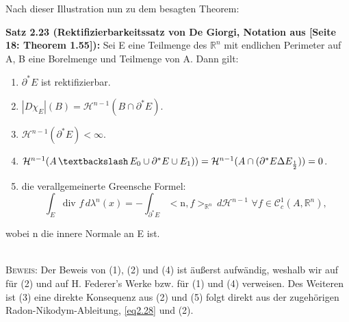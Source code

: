 Nach dieser Illustration nun zu dem besagten Theorem:\\[0.5cm]
\colorbox{generalYellow}{\begin{minipage}{16cm}{\textcolor{black}{}{\label{theo2.23}}}
\textbf{Satz 2.23 (Rektifizierbarkeitssatz von De Giorgi, Notation aus \cite{BraidesApprox}[Seite 18: Theorem 1.55]):} Sei E eine Teilmenge des \(\mathbb{R}^n\) mit endlichen Perimeter auf A, B eine Borelmenge und Teilmenge von A. Dann gilt:
\begin{enumerate}
    \item \(\partial^* E\) ist rektifizierbar.
    \item \(|D \chi_E|(B) = \mathcal{H}^{n-1}(B \cap \partial^* E)\).
    \item \(\mathcal{H}^{n-1}(\partial^* E) < \infty\).
    \item \(\mathcal{H}^{n-1}(A \, \textbackslash \, E_0 \cup \partial^* E \cup E_1)) = \mathcal{H}^{n-1}(A \cap (\partial^* E \Delta E_{\frac{1}{2}})) = 0\).
    \item die verallgemeinerte Greensche Formel:
    \begin{equation}
        \int_E \text{div }f \, d\lambda^n(x) = - \int_{\partial^* E} <\text{n},f>_{\mathbb{R}^n} \, d\mathcal{H}^{n-1} \, \, \forall f \in \mathcal{C}^1_c(A,\mathbb{R}^n),
    \end{equation}
\end{enumerate}
wobei n die innere Normale an E ist.
\end{minipage}}\\

\textsc{Beweis:} Der Beweis von (1), (2) und (4) ist äußerst aufwändig, weshalb wir auf \cite{DeGiorgiRecTheorem} für (2) und auf H. Federer's Werke \cite{federer1947k} bzw. \cite{federer2014geometric} für (1) und (4) verweisen. Des Weiteren ist (3) eine direkte Konsequenz aus (2) und (5) folgt direkt aus der zugehörigen Radon-Nikodym-Ableitung, \eqref{eq2.28} und (2).\QEDB


